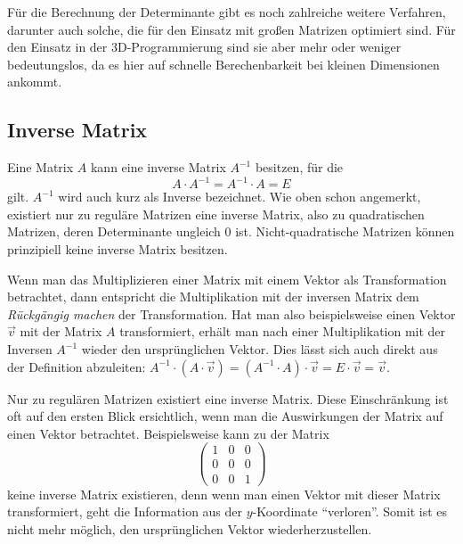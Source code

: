 Für die Berechnung der Determinante gibt es noch zahlreiche weitere Verfahren, darunter auch solche, die für den Einsatz mit großen Matrizen optimiert sind. Für den Einsatz in der 3D-Programmierung sind sie aber mehr oder weniger bedeutungslos, da es hier auf schnelle Berechenbarkeit bei kleinen Dimensionen ankommt.


\subsection{Inverse Matrix}
\label{inversion}
Eine Matrix $A$ kann eine inverse Matrix $A^{-1}$ besitzen, für die
\begin{equation}
 A \cdot A^{-1} = A^{-1} \cdot A = E
\end{equation}
gilt. $A^{-1}$ wird auch kurz als Inverse bezeichnet. Wie oben schon angemerkt, existiert nur zu reguläre Matrizen eine inverse Matrix, also zu quadratischen Matrizen, deren Determinante ungleich 0 ist. Nicht-quadratische Matrizen können prinzipiell keine inverse Matrix besitzen.

Wenn man das Multiplizieren einer Matrix mit einem Vektor als Transformation betrachtet, dann entspricht die Multiplikation mit der inversen Matrix dem \emph{Rückgängig machen} der Transformation. Hat man also beispielsweise einen Vektor $\vec v$ mit der Matrix $A$ transformiert, erhält man nach einer Multiplikation mit der Inversen $A^{-1}$ wieder den ursprünglichen Vektor. Dies lässt sich auch direkt aus der Definition abzuleiten: $A^{-1} \cdot ( A \cdot \vec v ) = (A^{-1} \cdot A) \cdot \vec v = E \cdot \vec v = \vec v$.

Nur zu regulären Matrizen existiert eine inverse Matrix. Diese Einschränkung ist oft auf den ersten Blick ersichtlich, wenn man die Auswirkungen der Matrix auf einen Vektor betrachtet. Beispielsweise kann zu der Matrix
\begin{equation}
 \begin{pmatrix}
  1 & 0 & 0 \\
  0 & 0 & 0 \\
  0 & 0 & 1
 \end{pmatrix}
\end{equation}
keine inverse Matrix existieren, denn wenn man einen Vektor mit dieser Matrix transformiert, geht die Information aus der $y$-Koordinate \enquote{verloren}. Somit ist es nicht mehr möglich, den ursprünglichen Vektor wiederherzustellen.

